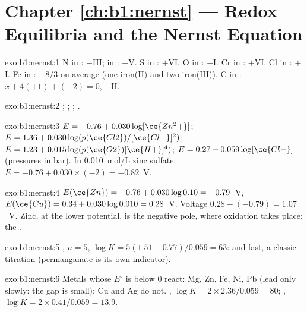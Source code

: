 \section*{Chapter \ref{ch:b1:nernst} --- Redox Equilibria and the Nernst Equation}

\begin{solution}{exo:b1:nernst:1}
N in : $-$III; in : $+$V. S in : $+$VI. O in
: $-$I. Cr in : $+$VI. Cl in : $+$I. Fe in
: $+8/3$ on average (one iron(II) and two iron(III)). C in
: $x + 4(+1) + (-2) = 0$, $-$II.
\end{solution}

\begin{solution}{exo:b1:nernst:2}
;
;
;
.
\end{solution}

\begin{solution}{exo:b1:nernst:3}
$E = -0.76 + 0.030\log[\ce{Zn^2+}]$; $E = 1.36 + 0.030\log(p(\ce{Cl2})/[\ce{Cl-}]^2)$;
$E = 1.23 + 0.015\log(p(\ce{O2})[\ce{H+}]^4)$; $E = 0.27 - 0.059\log[\ce{Cl-}]$
(pressures in bar). In \qty{0.010}{mol/L} zinc sulfate:
$E = -0.76 + 0.030 \times (-2) = -0.82$~V.
\end{solution}

\begin{solution}{exo:b1:nernst:4}
$E(\ce{Zn}) = -0.76 + 0.030\log 0.10 = -0.79$~V, $E(\ce{Cu}) = 0.34 +
0.030\log 0.010 = 0.28$~V. Voltage $0.28 - (-0.79) = 1.07$~V. Zinc, at the
lower potential, is the negative pole, where oxidation takes place: the
.
\end{solution}

\begin{solution}{exo:b1:nernst:5}
, $n = 5$,
$\log K = 5(1.51 - 0.77)/0.059 = 63$:  and fast, a classic
titration (permanganate is its own indicator).
\end{solution}

\begin{solution}{exo:b1:nernst:6}
Metals whose $E^\circ$ is below 0 react: Mg, Zn, Fe, Ni, Pb (lead only
slowly: the gap is small); Cu and Ag do not. , $\log K = 2 \times 2.36/0.059 = 80$;
, $\log K = 2 \times 0.41/0.059 = 13.9$.
\end{solution}

